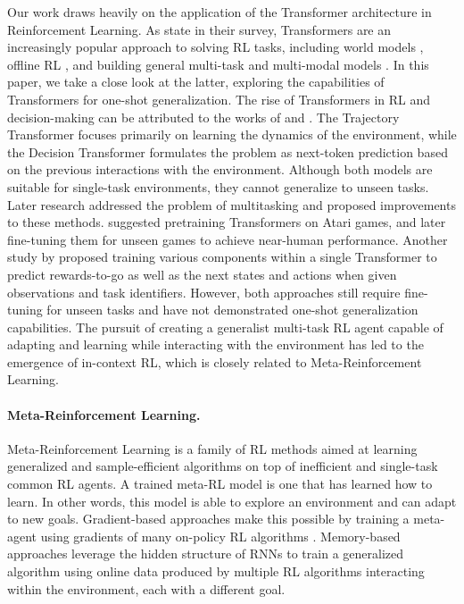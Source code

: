 \documentclass{article}
\theoremstyle{plain}
\theoremstyle{definition}
\theoremstyle{remark}
\begin{document}
Our work draws heavily on the application of the Transformer architecture \cite{vaswani2017attention} in Reinforcement Learning. As \citet{agarwal2023transformers} state in their survey, Transformers are an increasingly popular approach to solving RL tasks, including world models \cite{iris2023}, offline RL \cite{yamagata2022qlearning}, and building general multi-task and multi-modal models \cite{reed2022generalist}. In this paper, we take a close look at the latter, exploring the capabilities of Transformers for one-shot generalization. The rise of Transformers in RL and decision-making can be attributed to the works of \citet{chen2021decision} and \citet{janner2021sequence}. The Trajectory Transformer focuses primarily on learning the dynamics of the environment, while the Decision Transformer formulates the problem as next-token prediction based on the previous interactions with the environment. Although both models are suitable for single-task environments, they cannot generalize to unseen tasks. Later research addressed the problem of multitasking and proposed improvements to these methods. \citet{lee2022multi} suggested pretraining Transformers on Atari games, and later fine-tuning them for unseen games to achieve near-human performance. Another study by \citet{lin2022switch} proposed training various components within a single Transformer to predict rewards-to-go as well as the next states and actions when given observations and task identifiers. However, both approaches still require fine-tuning for unseen tasks and have not demonstrated one-shot generalization capabilities. The pursuit of creating a generalist multi-task RL agent capable of adapting and learning while interacting with the environment has led to the emergence of in-context RL, which is closely related to Meta-Reinforcement Learning.

\paragraph{Meta-Reinforcement Learning.}

Meta-Reinforcement Learning is a family of RL methods aimed at learning generalized and sample-efficient algorithms on top of inefficient and single-task common RL agents. A trained meta-RL model is one that has learned how to learn. In other words, this model is able to explore an environment and can adapt to new goals. Gradient-based approaches make this possible by training a meta-agent using gradients of many on-policy RL algorithms \cite{finn2017model}. Memory-based approaches leverage the hidden structure of RNNs \cite{hochreiter2001learning, duan2016rl, wang2016learning} to train a generalized algorithm using online data produced by multiple RL algorithms interacting within the environment, each with a different goal. 
\end{document}
